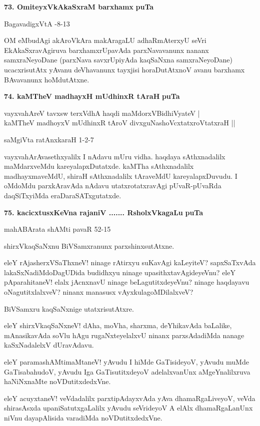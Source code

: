 \medskip
\noindent
\textbf{73. OmiteyxVkAkaSxraM barxhamx} \hfill{\bf puTa \pageref{148}}

\hfill{BagavadigxVtA -8-13}

\smallskip
OM eMbudAgi akAroVkAra makAragaLU adhaRmAterxyU seVri EkAkaSxravAgiruva barxhamxrUpa\-vAda parxNavavanunx nananx samxraNeyoDane (parxNava savxrUpiyAda kaqSaNxna samxraNeyoDane) ucacxrisutAtx yAva\-nu deVhavanunx tayxjisi horaDutAtxnoV avanu barxhamx BAvavanunx hoMdutAtxne.

\eject

\noindent
\textbf{74. kaMTheV madhayxH mUdhinxR tAraH} \hfill{\bf puTa \pageref{153}}

\begin{shloka}
vayxvahAreV tavxsw terxVdhA haqdi maMdorxVBidhiVyateV |\\
kaMTheV madhoyxV mUdhinxR tAroV divxguNashoVcxtatxroVtatxraH ||
\end{shloka}

\hfill{saMgiVta ratAnxkaraH 1-2-7}

\smallskip
vayxvahArAvasethxyalilx I nAdavu mUru vidha. haqdaya sAthxnadalilx maMdarxveMdu kareyalapxDutatxde. kaMTha sAthxnadalilx madhayxmaveMdU, shiraH sAthxnadalilx tAraveMdU kareyalapxDuvudu. I oMdoMdu parxkAra\-vAda nAdavu utatxrotatxravAgi pUvaR-pUvaRda daqSiTxyiMda eraDaraSATxgutatxde.

\medskip
\noindent
\textbf{75. kacicxtusxKeVna rajaniV ....... RsholxVkagaLu} \hfill{\bf puTa \pageref{162}}

\hfill{mahABArata shAMti pavaR 52-15}

\smallskip
shirxVkaqSaNxnu BiVSamxranunx parxshinxsutAtxne.

eleY rAjasherxVSaThxneV! ninage rAtirxyu suKavAgi kaLeyiteV? sapxSaTxvAda lakaSxNadiMdoDagUDida budidhx\-yu ninage upasithxtavAgideyeVnu? eleY pAparahitaneV! elalx jAcnxnavU ninage beLagutitxdeyeVnu? ninage haqdayavu oNagutitxlalxveV? ninanx manasusx vAyxkulagoMDilalxveV?

BiVSamxru kaqSaNxnige utatxrisutAtxre.

eleY shirxVkaqSaNxneV! dAha, moVha, sharxma, deYhikavAda baLalike, mAnasikavAda soVlu hAgu rugaNxte\-yelalxvU ninanx parxsAdadiMda nanage kaSxNadalelxV dUravAdavu.

eleY paramashAMtimaMtaneV! yAvudu I hiMde GaTisideyoV, yAvudu muMde GaTisabahu\-doV, yAvudu Iga GaTisutitxdeyoV adelalxvanUnx aMgeYnalilxruva haNiNxnaMte noVDutitxdedxVne.

eleY acuyxtaneV! veVdadalilx parxtipAdayxvAda yAva dhamaRgaLiveyoV, veVda shirasAsxda upaniSatutx\-gaLalilx yAvudu seVrideyoV A elAlx dhamaRgaLanUnx niVnu dayapAlisida varadiMda noVDutitxdedxVne.

